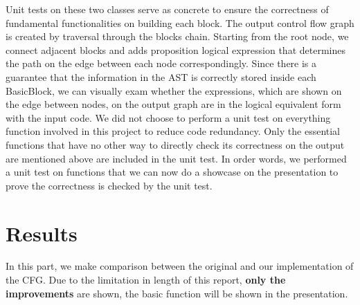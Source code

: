 \documentclass[11pt]{article}
\begin{document}
Unit tests on these two classes serve as concrete to ensure the correctness of fundamental functionalities on building each block. The output control flow graph is created by traversal through the blocks chain. Starting from the root node, we connect adjacent blocks and adds proposition logical expression that determines the path on the edge between each node correspondingly. Since there is a guarantee that the information in the AST is correctly stored inside each BasicBlock, we can visually exam whether the expressions, which are shown on the edge between nodes, on the output graph are in the logical equivalent form with the input code. We did not choose to perform a unit test on everything function involved in this project to reduce code redundancy. Only the essential functions that have no other way to directly check its correctness on the output are mentioned above are included in the unit test. In order words, we performed a unit test on functions that we can now do a showcase on the presentation to prove the correctness is checked by the unit test.

\section{Results}\label{results}
In this part, we make comparison between the original and our implementation of the CFG. Due to the limitation in length of this report, \textbf{only the improvements} are shown, the basic function will be shown in the presentation.
\end{document}
